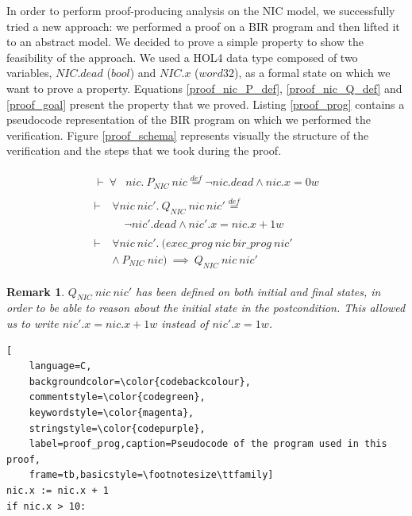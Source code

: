 \documentclass[10pt,a4paper]{article}
\newcommand{\eqdef}{\stackrel{def}{=}}
\newtheorem{remark}{Remark}
\begin{document}
\begin{multicols}{2}
In order to perform proof-producing analysis on the NIC model, we successfully tried a new approach: we performed a proof on a BIR program and then lifted it to an abstract model. We decided to prove a simple property to show the feasibility of the approach. We used a HOL4 data type composed of two variables, $NIC.dead$ ($bool$) and $NIC.x$ ($word32$), as a formal state on which we want to prove a property. Equations \ref{proof_nic_P_def}, \ref{proof_nic_Q_def} and \ref{proof_goal} present the property that we proved. Listing \ref{proof_prog} contains a pseudocode representation of the BIR program on which we performed the verification. Figure \ref{proof_schema} represents visually the structure of the verification and the steps that we took during the proof.
%
\begin{small}
\begin{align}
  \begin{split}
    \label{proof_nic_P_def}
    \vdash~\forall &nic.~P_{NIC}~nic \eqdef \neg nic.dead \land nic.x = 0w
  \end{split}\\
  \begin{split}
    \label{proof_nic_Q_def}
    \vdash~&\forall nic~nic'.~Q_{NIC}~nic~nic' \eqdef\\
      &~~~~~\neg nic'.dead \land nic'.x = nic.x + 1w
  \end{split}\\
  \begin{split}
    \label{proof_goal}
    \vdash~&\forall nic~nic'.~(exec\_prog~nic~bir\_prog~nic'\\
      &\land~P_{NIC}~nic)~\implies~Q_{NIC}~nic~nic'
  \end{split}
\end{align}
\end{small}
%
\begin{remark} \label{remark_Q_nic_intial_final}
  $Q_{NIC}~nic~nic'$ has been defined on both initial and final states, in order to be able to reason about the initial state in the postcondition. This allowed us to write $nic'.x = nic.x + 1w$ instead of $nic'.x = 1w$.
\end{remark}
%
\begin{lstlisting}[
    language=C,
    backgroundcolor=\color{codebackcolour},
    commentstyle=\color{codegreen},
    keywordstyle=\color{magenta},
    stringstyle=\color{codepurple},
    label=proof_prog,caption=Pseudocode of the program used in this proof,
    frame=tb,basicstyle=\footnotesize\ttfamily]
nic.x := nic.x + 1
if nic.x > 10:

\end{lstlisting}
\end{multicols}
\end{document}

